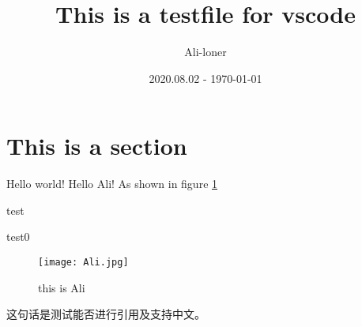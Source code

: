 \documentclass{article}
\title{\heiti\zihao{2} This is a testfile for vscode}
\author{\songti Ali-loner}
\date{2020.08.02 - \today}
\newcommand{\upcite}[1]{\textsuperscript{\cite{#1}}}
\begin{document}
	\maketitle
	\thispagestyle{empty}

\begin{abstract}
	\lipsum[2]
\end{abstract}

\tableofcontents

\section{This is a section}
Hello world! Hello Ali! As shown in figure \ref{1}

test

test0

\begin{figure}[htbp]
	\centering
	\texttt{[image: Ali.jpg]}
	\caption{this is Ali}
	\label{1}
\end{figure}

这句话是测试能否进行引用及支持中文\upcite{1}。

\end{document}
